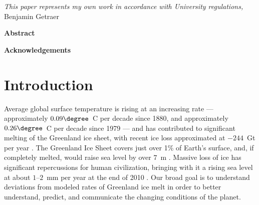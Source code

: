 \documentclass[11pt]{report}
\begin{document}



\thispagestyle{empty}
\vspace*{3in}
\begin{center}
\emph{This paper represents my own work in accordance with University regulations,} \\
Benjamin Getraer %
\end{center}
\clearpage

\begin{center}
\Large \textbf{Abstract}
\end{center}
 
 \clearpage

\begin{center}
\Large \textbf{Acknowledgements}
\end{center}

\clearpage

\thispagestyle{empty}
\tableofcontents
\clearpage

\listoffigures
\listoftables
\clearpage

\fancyhead{}
\fancyfoot{}
\pagestyle{fancyplain}

{\newpage\renewcommand{\thepage}{\arabic{page}}\setcounter{page}{1}}


\section{Introduction \label{sec:introduction}}

Average global surface temperature is rising at an increasing rate --- approximately $0.09\degree$~C per decade since 1880, and approximately $0.26\degree$~C per decade since 1979 \cite[][]{ipcc2013_atmosphere}
--- and has contributed to significant melting of the
Greenland ice sheet, with recent ice loss approximated at $-244$~Gt per
year \cite[][]{Harig+2015a,Harig+2016}. The Greenland Ice Sheet covers just over 1\% of
Earth's surface, and, if completely melted, would raise sea level by over $7$~m
\cite[][]{ipcc2013_cryosphere}.
Massive loss of ice has
significant repercussions for human civilization, bringing with it a rising sea
level at about $1$--$2$~mm per year at the end of 2010
\cite[][]{ipcc2013_sealevel}.  Our broad goal is to understand deviations from modeled rates of Greenland ice melt in order to better understand, predict, and
communicate the changing conditions of the planet.
\end{document}
